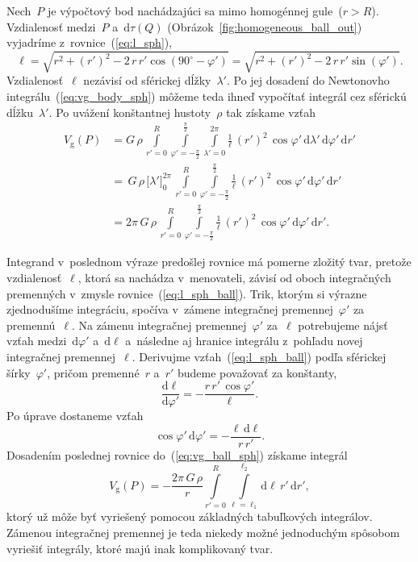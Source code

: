 \documentclass[a4paper, 12pt]{book}
\newcommand{\diff}{\mathrm d}
\newcommand{\gidx}{\mathrm g}
\begin{document}
Nech~$P$ je výpočtový bod nachádzajúci sa mimo homogénnej gule~($r > R$).  
Vzdialenosť medzi~$P$ a~$\diff \tau(Q)$ 
(Obrázok~\ref{fig:homogeneous_ball_out}) vyjadríme z~rovnice~(\ref{eq:l_sph}),
%
\begin{equation}
\label{eq:l_sph_ball}
\ell = \sqrt{r^2 + (r')^2 - 2 \, r \, r' \cos(90^{\circ} - \varphi')} 
= \sqrt{r^2 + (r')^2 - 2 \, r \, r' \sin(\varphi')}{.}
\end{equation}
%
Vzdialenosť~$\ell$ nezávisí od sférickej dĺžky~$\lambda'$.  Po jej dosadení do 
Newtonovho integrálu~(\ref{eq:vg_body_sph}) môžeme teda ihneď vypočítať 
integrál cez sférickú dĺžku~$\lambda'$.  Po uvážení konštantnej hustoty~$\rho$ 
tak získame vzťah
%
\begin{equation}
\label{eq:vg_ball_sph}
\begin{split}
V_\gidx(P) &= G \, \rho \, \int\limits_{r' = 0}^{R} \int\limits_{\varphi' 
= -\frac{\pi}{2}}^{\frac{\pi}{2}} \int\limits_{\lambda' = 0}^{2\pi} 
\frac{1}{\ell} \, (r')^2 \, \cos\varphi' \, \diff \lambda' \, \diff \varphi' \, 
\diff r'\\
%
&=\, G \, \rho \, \big[ \lambda' \big]_{0}^{2\pi} \, \int\limits_{r' = 0}^{R} 
\int\limits_{\varphi' = -\frac{\pi}{2}}^{\frac{\pi}{2}} \frac{1}{\ell} \, 
(r')^2 \, \cos\varphi' \, \diff \varphi' \, \diff r'\\
%
&=2\pi \, G \, \rho \, \int\limits_{r' = 0}^{R} \int\limits_{\varphi' 
= -\frac{\pi}{2}}^{\frac{\pi}{2}} \frac{1}{\ell} \, (r')^2 \, \cos\varphi' \, 
\diff \varphi' \, \diff r'{.}
\end{split}
\end{equation}

Integrand v~poslednom výraze predošlej rovnice má pomerne zložitý tvar, pretože 
vzdialenosť~$\ell$, ktorá sa nachádza v~menovateli, závisí od oboch 
integračných premenných v~zmysle rovnice~(\ref{eq:l_sph_ball}).  Trik, ktorým 
si výrazne zjednodušíme integráciu, spočíva v~zámene integračnej 
premennej~$\varphi'$ za premennú~$\ell$.  Na zámenu integračnej 
premennej~$\varphi'$ za~$\ell$ potrebujeme nájsť vzťah medzi~$\diff \varphi'$ 
a~$\diff \ell$ a~následne aj hranice integrálu z~pohľadu novej integračnej 
premennej~$\ell$.  Derivujme vzťah~(\ref{eq:l_sph_ball}) podľa sférickej 
šírky~$\varphi'$, pričom premenné~$r$ a~$r'$ budeme považovať za konštanty,
%
\begin{equation}
\frac{\diff \ell}{\diff \varphi'} = -\frac{r \, r' \, \cos\varphi'}{\ell}{.}
\end{equation}
%
Po úprave dostaneme vzťah
%
\begin{equation}
\cos\varphi' \, \diff \varphi' = -\frac{\ell \, \diff \ell}{r \, r'}{.}
\end{equation}
%
Dosadením poslednej rovnice do~(\ref{eq:vg_ball_sph}) získame integrál
%
\begin{equation}
\label{eq:vg_ball_sph_tmp}
V_\gidx(P) = -\frac{2\pi \, G \, \rho}{r} \int\limits_{r' = 0}^R 
\int\limits_{\ell = \ell_1}^{\ell_2} \diff \ell \, r' \, \diff r'{,}
\end{equation}
%
ktorý už môže byť vyriešený pomocou základných tabuľkových integrálov.  Zámenou 
integračnej premennej je teda niekedy možné jednoduchým spôsobom vyriešiť 
integrály, ktoré majú inak komplikovaný tvar.
\end{document}
